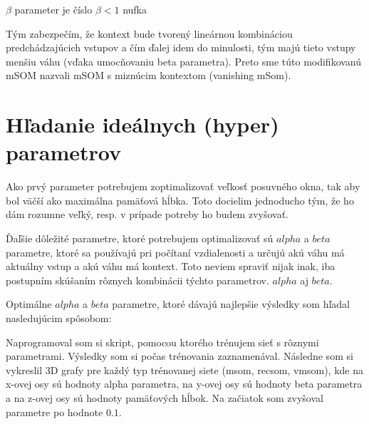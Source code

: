 $\beta$ parameter je číslo $\beta < 1$
nufka

Tým zabezpečím, že kontext bude tvorený lineárnou kombináciou 
predchádzajúcich vstupov a čím ďalej idem do minulosti, tým majú tieto vstupy 
menšiu váhu (vďaka umocňovaniu beta parametra). Preto sme túto modifikovanú mSOM nazvali 
mSOM s miznúcim kontextom (vanishing mSom).

\section{Hľadanie ideálnych (hyper) parametrov}
Ako prvý parameter potrebujem zoptimalizovať veľkosť posuvného okna, tak aby bol väčší ako
maximálna pamäťová hĺbka. Toto docielim jednoducho tým, že ho dám rozumne veľký, resp. v prípade
potreby ho budem zvyšovať.

Ďaľšie dôležité parametre, ktoré potrebujem optimalizovať sú $alpha$ a $beta$ parametre, ktoré 
sa používajú pri počítaní vzdialenosti a určujú akú váhu má aktuálny vstup a akú váhu má kontext.
Toto neviem spraviť nijak inak, iba postupním skúšaním rôznych kombinácii týchto parametrov. 
$alpha$ aj $beta$.

Optimálne $alpha$ a $beta$ parametre, ktoré dávajú najlepšie výsledky som hľadal nasledujúcim
spôsobom:

Naprogramoval som si skript, pomocou ktorého trénujem sieť s rôznymi parametrami.
Výsledky som si počas trénovania zaznamenával.
Následne som si vykreslil 3D grafy pre každý typ trénovanej siete (msom, recsom, vmsom), 
kde na x-ovej osy sú hodnoty alpha parametra, na y-ovej osy sú hodnoty beta parametra a
na z-ovej osy sú hodnoty pamäťových hĺbok.
Na začiatok som zvyšoval parametre po hodnote $0.1$.








